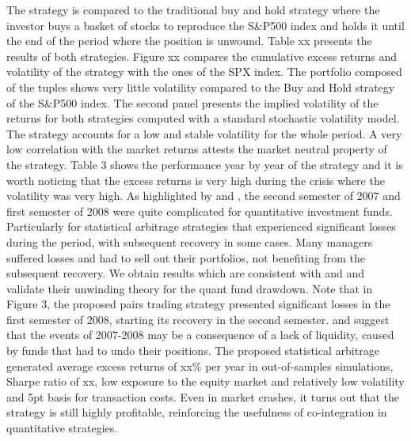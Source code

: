 \documentclass[11pt,a4,twosided,singlespacing,titlepagenumber=on]{scrreprt}
\numberwithin{equation}{chapter} %
\theoremstyle{remark}
\begin{document}
The strategy is compared to the traditional buy and hold strategy where the investor buys a basket of stocks to reproduce the S\&P500 index and holds it until the end of the period where the position is unwound. Table xx presents the results of both strategies. Figure xx compares the cumulative excess returns and volatility of the strategy with the ones of the SPX index. The portfolio composed of the tuples shows very little volatility compared to the Buy and Hold strategy of the S\&P500 index. The second panel presents the implied volatility of the returns for both strategies computed with a standard stochastic volatility model. The strategy accounts for a low and stable volatility for the whole period. A very low correlation with the market returns attests the market neutral property of the strategy. Table 3 shows the performance year by year of the strategy and it is worth noticing that the excess returns is very high during the crisis where the volatility was very high. As highlighted by \cite{khandani2007} and \cite{avellaneda2010}, the second semester of 2007 and first semester of 2008 were quite complicated for quantitative investment funds. Particularly for statistical arbitrage strategies that experienced significant losses during the period, with subsequent recovery in some cases. Many managers suffered losses and had to sell out their portfolios, not benefiting from the subsequent recovery. We obtain results which are consistent with \cite{khandani2007} and \cite{avellaneda2010} and validate their unwinding theory for the quant fund drawdown. Note that in Figure 3, the proposed pairs trading strategy presented significant losses in the first semester of 2008, starting its recovery in the second semester. \cite{khandani2007} and \cite{avellaneda2010} suggest that the events of 2007-2008 may be a consequence of a lack of liquidity, caused by funds that had to undo their positions. The proposed statistical arbitrage generated average excess returns of xx\% per year in out-of-samples simulations, Sharpe ratio of xx, low exposure to the equity market and relatively low volatility and 5pt basis for transaction costs. Even in market crashes, it turns out that the strategy is still highly profitable, reinforcing the usefulness of co-integration in quantitative strategies.
\end{document}
